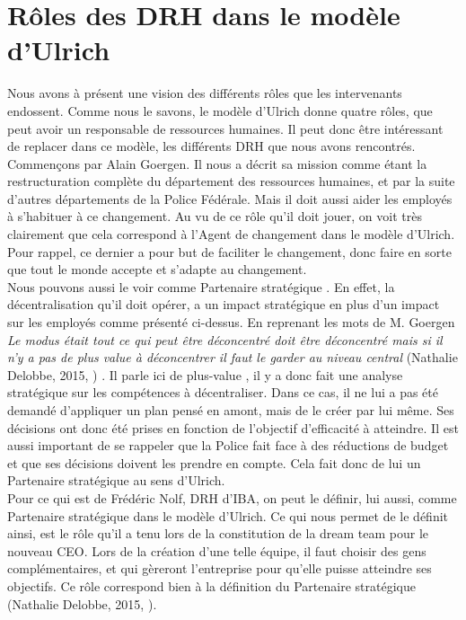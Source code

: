 \section{Rôles des DRH dans le modèle d'Ulrich}

Nous avons à présent une vision des différents rôles que les intervenants endossent. Comme nous le savons, le modèle d'Ulrich donne quatre rôles, que peut avoir un responsable de ressources humaines. Il peut donc être intéressant de replacer dans ce modèle, les différents DRH que nous avons rencontrés. \\

Commençons par Alain Goergen. Il nous a décrit sa mission comme étant la restructuration complète du département des ressources humaines, et par la suite d'autres départements de la Police Fédérale. Mais il doit aussi aider les employés à s'habituer à ce changement. Au vu de ce rôle qu'il doit jouer, on voit très clairement que cela correspond à l'\og Agent de changement \fg{} dans le modèle d'Ulrich. Pour rappel, ce dernier a pour but de faciliter le changement, donc faire en sorte que tout le monde accepte et s'adapte au changement.\\

Nous pouvons aussi le voir comme \og Partenaire stratégique \fg{}. En effet, la décentralisation qu'il doit opérer, a un impact stratégique en plus d'un impact sur les employés comme présenté ci-dessus. En reprenant les mots de M. Goergen \textit{\og Le modus était tout ce qui peut être déconcentré doit être déconcentré mais si il n'y a pas de plus value à déconcentrer il faut le garder au niveau central \fg{}} (Nathalie Delobbe, 2015, \cite{tableronde}) . Il parle ici de \og plus-value \fg{}, il y a donc fait une analyse stratégique sur les compétences à décentraliser. Dans ce cas, il ne lui a pas été demandé d'appliquer un plan pensé en amont, mais de le créer par lui même. Ses décisions ont donc été prises en fonction de l'objectif d'efficacité à atteindre. Il est aussi important de se rappeler que la Police fait face à des réductions de budget et que ses décisions doivent les prendre en compte. Cela fait donc de lui un \og Partenaire stratégique \fg{} au sens d'Ulrich.\\   

Pour ce qui est de Frédéric Nolf, DRH d'IBA, on peut le définir, lui aussi, comme \og{}Partenaire stratégique\fg{} dans le modèle d'Ulrich. Ce qui nous permet de le définit ainsi, est le rôle qu'il a tenu lors de la constitution de la \og dream team\fg{} pour le nouveau CEO. Lors de la création d'une telle équipe, il faut choisir des gens complémentaires, et qui gèreront l'entreprise pour qu'elle puisse atteindre ses objectifs. Ce rôle correspond bien à la définition du \og Partenaire stratégique \fg{} (Nathalie Delobbe, 2015, \cite{slidegrh}).\newline

